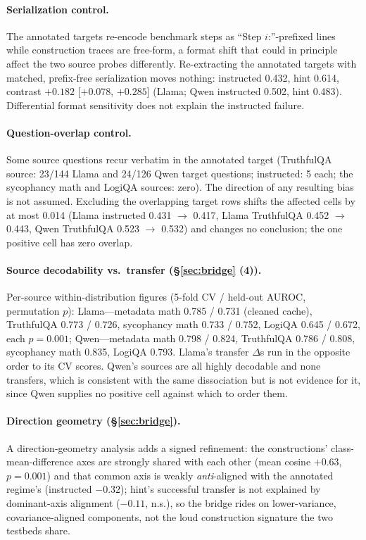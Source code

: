 \documentclass[11pt]{article}
\begin{document}
\paragraph{Serialization control.} The annotated targets re-encode benchmark steps as ``Step $i$:''-prefixed lines while construction traces are free-form, a format shift that could in principle affect the two source probes differently. Re-extracting the annotated targets with matched, prefix-free serialization moves nothing: instructed 0.432, hint 0.614, contrast $+0.182$ [$+0.078$, $+0.285$] (Llama; Qwen instructed 0.502, hint 0.483). Differential format sensitivity does not explain the instructed failure.

\paragraph{Question-overlap control.} Some source questions recur verbatim in the annotated target (TruthfulQA source: 23/144 Llama and 24/126 Qwen target questions; instructed: 5 each; the sycophancy math and LogiQA sources: zero). The direction of any resulting bias is not assumed. Excluding the overlapping target rows shifts the affected cells by at most 0.014 (Llama instructed 0.431 $\to$ 0.417, Llama TruthfulQA 0.452 $\to$ 0.443, Qwen TruthfulQA 0.523 $\to$ 0.532) and changes no conclusion; the one positive cell has zero overlap.

\paragraph{Source decodability vs.\ transfer (\S\ref{sec:bridge} (4)).} Per-source within-distribution figures (5-fold CV / held-out AUROC, permutation $p$): Llama---metadata math 0.785 / 0.731 (cleaned cache), TruthfulQA 0.773 / 0.726, sycophancy math 0.733 / 0.752, LogiQA 0.645 / 0.672, each $p{=}0.001$; Qwen---metadata math 0.798 / 0.824, TruthfulQA 0.786 / 0.808, sycophancy math 0.835, LogiQA 0.793. Llama's transfer $\Delta$s run in the opposite order to its CV scores. Qwen's sources are all highly decodable and none transfers, which is consistent with the same dissociation but is not evidence for it, since Qwen supplies no positive cell against which to order them.

\paragraph{Direction geometry (\S\ref{sec:bridge}).} A direction-geometry analysis adds a signed refinement: the constructions' class-mean-difference axes are strongly shared with each other (mean cosine $+0.63$, $p{=}0.001$) and that common axis is weakly \emph{anti}-aligned with the annotated regime's (instructed $-0.32$); hint's successful transfer is not explained by dominant-axis alignment ($-0.11$, n.s.), so the bridge rides on lower-variance, covariance-aligned components, not the loud construction signature the two testbeds share.
\end{document}
